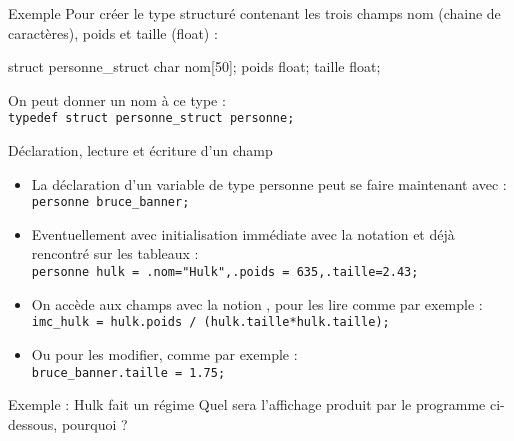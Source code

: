 \documentclass[10pt]{beamer}
\begin{document}
\begin{frame}[fragile]{\Ctitle}{\stitle}
\begin{exampleblock}{Exemple}
	Pour créer le type structuré  contenant les trois champs nom (chaine de caractères), poids et taille (float) :
		\begin{langageC}
struct personne_struct {
	char nom[50];
	poids float;
	taille float;
}
		\end{langageC}
	On peut donner un nom à ce type : \\
	\texttt{typedef struct personne_struct personne;}
\end{exampleblock}
\end{frame}

\begin{frame}[fragile]{\Ctitle}{\stitle}
	\begin{exampleblock}{Déclaration, lecture et écriture d'un champ}
	\begin{itemize}
		\item<1-> La déclaration d'un variable de type personne peut se faire maintenant avec : \\
		\texttt{personne bruce_banner;}
		\item<2-> Eventuellement avec initialisation immédiate avec la notation \kw{\{} et \kw{\{} déjà rencontré sur les tableaux : \\
		\texttt{personne hulk = {.nom="Hulk",.poids = 635,.taille=2.43};}
		\item<3-> On accède aux champs avec la notion , pour les lire comme par exemple :\\
		\texttt{imc_hulk = hulk.poids / (hulk.taille*hulk.taille);}
		\item<4-> Ou pour les modifier, comme par exemple : \\
		\texttt{bruce_banner.taille = 1.75;}
	\end{itemize}
	\end{exampleblock}
\end{frame}

\begin{frame}[fragile]{\Ctitle}{\stitle}
	\begin{exampleblock}{Exemple : Hulk fait un régime}
		Quel sera l'affichage produit par le programme ci-dessous, pourquoi ?
	\end{exampleblock}
\end{frame}
\end{document}
